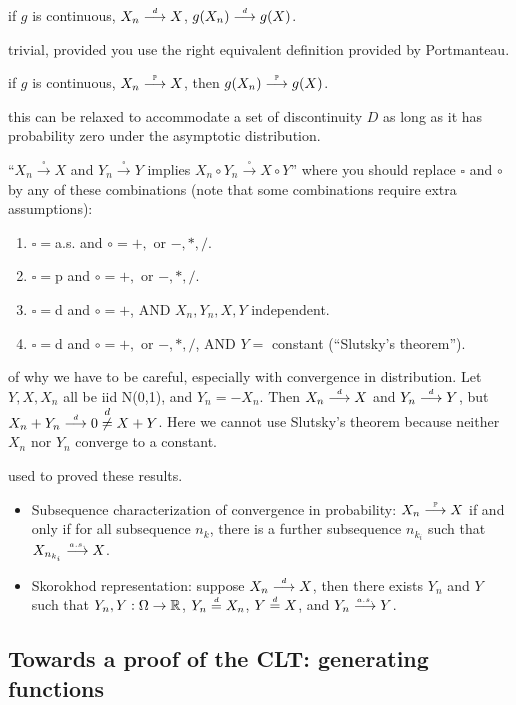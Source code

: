 \documentclass{article}
\begin{document}
 if $g$ is continuous, $X_n \stackrel{\scriptscriptstyle d}{\longrightarrow} X$,  $g(X_n) \stackrel{\scriptscriptstyle d}{\longrightarrow} g(X)$. 

 trivial, provided you use the right equivalent definition provided by Portmanteau.

 if $g$ is continuous, $X_n \stackrel{\scriptscriptstyle {\mathbb P}}{\longrightarrow} X$, then $g(X_n) \stackrel{\scriptscriptstyle {\mathbb P}}{\longrightarrow} g(X)$. 

 this can be relaxed to accommodate a set of discontinuity $D$ as long as it has probability zero under the asymptotic distribution.

 ``$X_n \stackrel{\square}{\longrightarrow} X$ and $Y_n \stackrel{\square}{\longrightarrow} Y$ implies $X_n \circ Y_n \stackrel{\square}{\longrightarrow} X \circ Y$'' where you should replace $\square$ and $\circ$ by any of these combinations (note that some combinations require extra assumptions):
\begin{enumerate}
  \item $\square = $a.s. and $\circ = +,$ or $-, *, /$.
  \item $\square = $p and $\circ = +,$ or $-, *, /$.
  \item $\square = $d and $\circ = +$, AND $X_n, Y_n, X, Y$ independent.
  \item $\square = $d and $\circ = +,$ or $-, *, /$, AND $Y = $ constant (``Slutsky's theorem'').
\end{enumerate}

 of why we have to be careful, especially with convergence in distribution. Let $Y, X, X_n$ all be iid N(0,1), and $Y_n = -X_n$. Then $X_n \stackrel{\scriptscriptstyle d}{\longrightarrow} X$ and $Y_n \stackrel{\scriptscriptstyle d}{\longrightarrow} Y$, but $X_n + Y_n \stackrel{\scriptscriptstyle d}{\longrightarrow} 0 \stackrel{d}{\neq} X+Y$. Here we cannot use Slutsky's theorem because neither $X_n$ nor $Y_n$ converge to a constant.

 used to proved these results.
\begin{itemize}
  \item Subsequence characterization of convergence in probability: $X_n \stackrel{\scriptscriptstyle {\mathbb P}}{\longrightarrow} X$ if and only if for all subsequence $n_k$, there is a further subsequence $n_{k_i}$ such that $X_{n_{k_i}} \stackrel{\scriptscriptstyle a.s.}{\longrightarrow} X$.
  \item Skorokhod representation: suppose $X_n \stackrel{\scriptscriptstyle d}{\longrightarrow} X$, then there exists $Y_n$ and $Y$ such that $Y_n, Y: \Omega \to {\mathbb R}$, $Y_n \stackrel{\scriptscriptstyle d}{=} X_n$, $Y \stackrel{\scriptscriptstyle d}{=} X$, and $Y_n \stackrel{\scriptscriptstyle a.s.}{\longrightarrow} Y$.
\end{itemize}


\subsection{Towards a proof of the CLT: generating functions}
\end{document}
